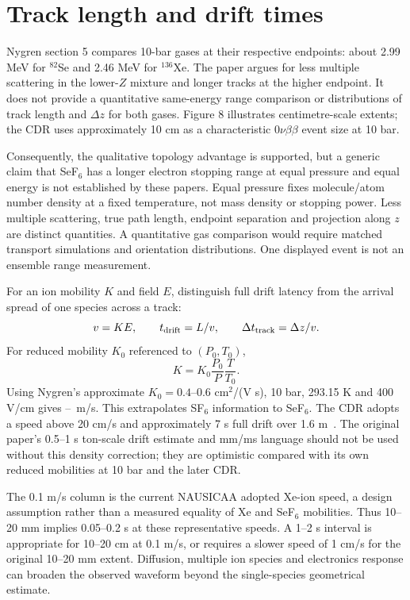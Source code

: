 \documentclass[11pt,a4paper]{article}
\begin{document}
\section{Track length and drift times}
Nygren section 5 compares 10-bar gases at their respective endpoints:
about 2.99 MeV for $^{82}$Se and 2.46 MeV for $^{136}$Xe. The paper argues
for less multiple scattering in the lower-$Z$ mixture and longer tracks at
the higher endpoint. It does not provide a quantitative same-energy range
comparison or distributions of track length and $\Delta z$ for both gases.
Figure 8 illustrates centimetre-scale extents; the CDR uses approximately
10 cm as a characteristic 0$\nu\beta\beta$ event size at 10 bar.

Consequently, the qualitative topology advantage is supported, but a generic
claim that SeF$_6$ has a longer electron stopping range at equal pressure and
equal energy is not established by these papers. Equal pressure fixes
molecule/atom number density at a fixed temperature, not mass density or
stopping power. Less multiple scattering, true path length, endpoint
separation and projection along $z$ are distinct quantities. A quantitative
gas comparison would require matched transport simulations and orientation
distributions. One displayed event is not an ensemble range measurement.

For an ion mobility $K$ and field $E$, distinguish full drift latency from
the arrival spread of one species across a track:
\begin{equation}
 v=KE,\qquad t_{\rm drift}=L/v,\qquad
 \Delta t_{\rm track}=\Delta z/v.
\end{equation}
For reduced mobility $K_0$ referenced to $(P_0,T_0)$,
\begin{equation}
 K=K_0\frac{P_0}{P}\frac{T}{T_0}.
\end{equation}
Using Nygren's approximate $K_0=0.4$--$0.6$ cm$^2$/(V s), 10 bar,
293.15 K and 400 V/cm gives \SpeedLow--\SpeedHigh\ m/s. This extrapolates
SF$_6$ information to SeF$_6$. The CDR adopts a speed above 20 cm/s and
approximately 7 s full drift over 1.6 m~\cite{NnDEx-100:2023alw}. The
original paper's 0.5--1 s ton-scale drift estimate and mm/ms language should
not be used without this density correction; they are optimistic compared
with its own reduced mobilities at 10 bar and the later CDR.

\begin{center}\small

\end{center}
The 0.1 m/s column is the current NAUSICAA adopted Xe-ion speed, a design
assumption rather than a measured equality of Xe and SeF$_6$ mobilities.
Thus 10--20 mm implies 0.05--0.2 s at these representative speeds. A
1--2 s interval is appropriate for 10--20 cm at 0.1 m/s, or requires a
slower speed of 1 cm/s for the original 10--20 mm extent. Diffusion,
multiple ion species and electronics response can broaden the observed
waveform beyond the single-species geometrical estimate.
\end{document}
